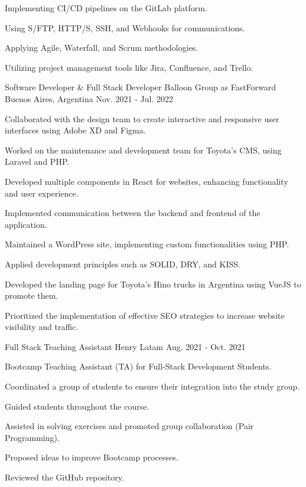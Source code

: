 \begin{cventries}
{\begin{cvitems}
        \item {Implementing CI/CD pipelines on the GitLab platform.}
        \item {Using S/FTP, HTTP/S, SSH, and Webhooks for communications.}
        \item {Applying Agile, Waterfall, and Scrum methodologies.}
        \item {Utilizing project management tools like Jira, Confluence, and Trello.}
      \end{cvitems}
    }
  \vspace{5.5mm}
  \cventry
    {Software Developer \& Full Stack Developer} %
    {Balloon Group as FastForward} %
    {Buenos Aires, Argentina} %
    {Nov. 2021 - Jul. 2022} %
    {
      \begin{cvitems} %
        \item {Collaborated with the design team to create interactive and responsive user interfaces using Adobe XD and Figma.}
        \item {Worked on the maintenance and development team for Toyota's CMS, using Laravel and PHP.}
        \item {Developed multiple components in React for websites, enhancing functionality and user experience.}
        \item {Implemented communication between the backend and frontend of the application.}
        \item {Maintained a WordPress site, implementing custom functionalities using PHP.}
        \item {Applied development principles such as SOLID, DRY, and KISS.}
        \item {Developed the landing page for Toyota's Hino trucks in Argentina using VueJS to promote them.}
        \item {Prioritized the implementation of effective SEO strategies to increase website visibility and traffic.}
      \end{cvitems}
    }
  \vspace{5.5mm}
  \cventry
    {Full Stack Teaching Assistant} %
    {Henry} %
    {Latam} %
    {Aug. 2021 - Oct. 2021} %
    {
      \begin{cvitems} %
        \item {Bootcamp Teaching Assistant (TA) for Full-Stack Development Students.}
        \item {Coordinated a group of students to ensure their integration into the study group.}
        \item {Guided students throughout the course.}
        \item {Assisted in solving exercises and promoted group collaboration (Pair Programming).}
        \item {Proposed ideas to improve Bootcamp processes.}
        \item {Reviewed the GitHub repository.}
      \end{cvitems}
    }

\end{cventries}

